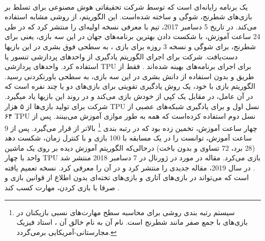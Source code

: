   

\paragraph{}
یک برنامه رایانه‌ای است که توسط شرکت تحقیقاتی هوش مصنوعی
 برای تسلط بر بازی‌های شطرنج، شوگی و 
ساخته شده‌است. این الگوریتم، از روشی مشابه
  استفاده می‌کند. در تاریخ 5 دسامبر 2017،  تیم
  با معرفی
   نسخه اولیه‌ای را منتشر کرد که در طی 24 ساعت آموزش، با شکست دادن بهترین برنامه‌های جهان در این سه بازی، یعنی
    برای شطرنج،
برای شوگی و نسخه 3 روزه
برای بازی 
،
به سطحی فوق بشری در این بازی\nf ها دست‌یافت.  شرکت 
برای اجرای الگوریتم یادگیری
از واحدهای پردازشی تنسور 
یا 
استفاده کرد. واحدهای پردازشی TPU برای اجرای برنامه‌های
بهینه شده‌اند
\cite{silver2017}.
  فقط از طریق 
و بدون استفاده از دانش بشری در این سه بازی، به سطحی باورنکردنی رسید. الگوریتم بازی با خود، یک روش یادگیری تقویتی برای بازی‌های دو یا چند نفره است که در آن عامل، در مقابل یک کپی از خودش بازی می‌کند و در روند این بازی\nf ها یاد می\nf گیرد.
شرکت
  برای تولید  بازی‌ها از ۵ هزار TPU نسل اول و برای یادگیری شبکه‌های عصبی از ۶۴ TPU نسل دوم استفاده کرده‌است که همه به طور موازی آموزش می‌بینند.
پس از چهار ساعت آموزش،
  تخمین زده بود که
    در رتبه بندی
\footnote{سیستم رتبه بندی
	  روشی برای محاسبه سطح مهارت‌های نسبی بازیکنان در بازی‌های با جمع صفر مانند شطرنج است. نام آن به نام خالق آن
،
استاد فیزیک مجارستانی-آمریکایی برمی‌گردد.}
بالاتر از
  قرار می‌گیرد. پس از 9 ساعت آموزش، توانست
را در یک مسابقه با 100 بازی و با کنترل زمان، شکست دهد (28 برد، 72 تساوی و بدون باخت) 
\cite{silver2017} \cite{knapton2017entire} \cite{superhuman2017}
درحالی‌که الگوریتم آموزش دیده 
بر روی یک ماشین واحد با چهار TPU بازی می‌کرد.
مقاله
  در مورد
    در ژورنال
در 7 دسامبر 2018 منتشر شد
\cite{silver2018general}.
در سال 2019،
مقاله جدیدی را منتشر کرد و در آن
را معرفی کرد. 
نسخه تعمیم یافته 
است که می‌تواند در بازی‌های آتاری و بازی‌های تخته‌ای 
 بدون اطلاع از قوانین بازی و صرفا با بازی کردن، مهارت کسب کند
 \cite{alphazerowiki}.



